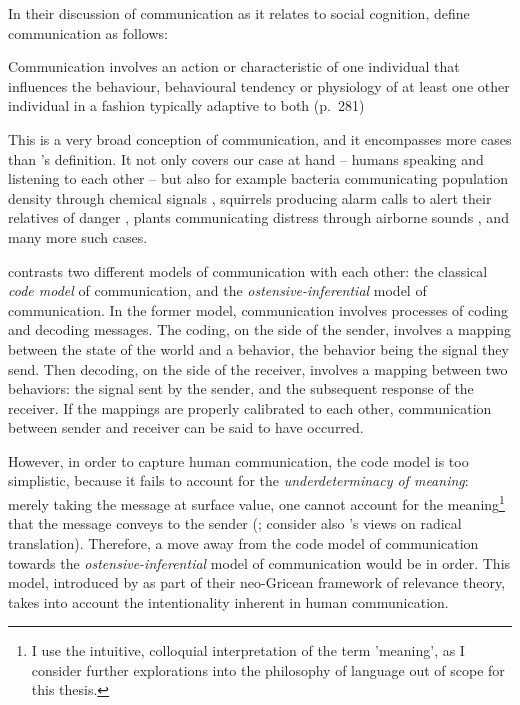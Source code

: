 In their discussion of communication as it relates to social cognition, \citet{Freeberg19} define communication as follows:
\begin{quoting}
    Communication involves an action or characteristic of one individual that influences the behaviour, behavioural tendency or physiology of at least one other individual in a fashion typically adaptive to both
    \hfill (p.~281)
\end{quoting}
This is a very broad conception of communication, and it encompasses more cases than \citeauthor{DawkinsKrebs78}'s definition. It not only covers our case at hand -- humans speaking and listening to each other -- but also for example bacteria communicating population density through chemical signals \citep{Federle03}, squirrels producing alarm calls to alert their relatives of danger \citep{Sherman77}, plants communicating distress through airborne sounds \citep{Khait23}, and many more such cases.

\citet{Scott-Phillips15-primate} contrasts two different models of communication with each other: the classical \emph{code model} of communication, and the \emph{ostensive-inferential} model of communication.
In the former model, communication involves processes of coding and decoding messages. The coding, on the side of the sender, involves a mapping between the state of the world and a behavior, the behavior being the signal they send. Then decoding, on the side of the receiver, involves a mapping between two behaviors: the signal sent by the sender, and the subsequent response of the receiver. If the mappings are properly calibrated to each other, communication between sender and receiver can be said to have occurred.

However, in order to capture human communication, the code model is too simplistic, because it fails to account for the \emph{underdeterminacy of meaning}: merely taking the message at surface value, one cannot account for the meaning\footnote{I use the intuitive, colloquial interpretation of the term 'meaning', as I consider further explorations into the philosophy of language out of scope for this thesis.} that the message conveys to the sender (\citet{Scott-Phillips18-communication}; consider also \citet{Quine60}'s views on radical translation).
Therefore, a move away from the code model of communication towards the \emph{ostensive-inferential} model of communication would be in order. This model, introduced by \citet{SperberWilson86} as part of their neo-Gricean framework of relevance theory, takes into account the intentionality inherent in human communication.

